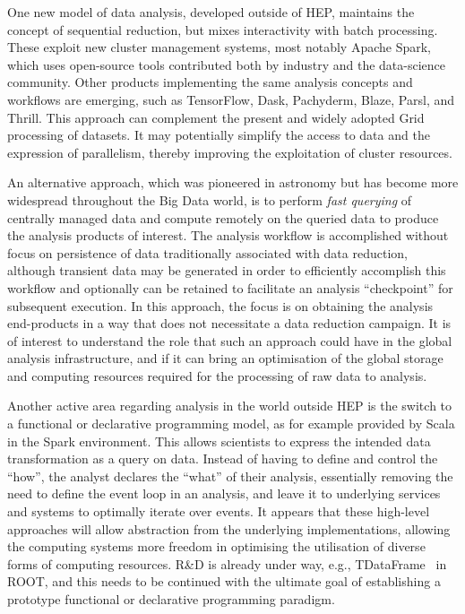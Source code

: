 \documentclass[twocolumn]{svjour3}          %
\begin{document}
One new model of data analysis, developed outside of HEP, maintains the
concept of sequential reduction, but mixes interactivity with
batch processing. These exploit new cluster management systems, most
notably Apache Spark, which uses open-source tools contributed both by
industry and the data-science community. Other products implementing the
same analysis concepts and workflows are emerging, such as TensorFlow,
Dask, Pachyderm, Blaze, Parsl, and Thrill. This approach can complement
the present and widely adopted Grid processing of datasets. It may
potentially simplify the access to data and the expression of
parallelism, thereby improving the exploitation of cluster resources.

An alternative approach, which was pioneered in astronomy but has become
more widespread throughout the Big Data world, is to perform \emph{fast
querying} of centrally managed data and compute remotely on the queried
data to produce the analysis products of interest. The analysis workflow
is accomplished without focus on persistence of data traditionally
associated with data reduction, although transient data may be generated
in order to efficiently accomplish this workflow and optionally can be
retained to facilitate an analysis ``checkpoint'' for subsequent
execution. In this approach, the focus is on obtaining the analysis
end-products in a way that does not necessitate a data reduction
campaign. It is of interest to understand the role
that such an approach could have in the global analysis infrastructure,
and if it can bring an optimisation of the global storage and computing
resources required for the processing of raw data to analysis.

Another active area regarding analysis in the world outside HEP is the
switch to a functional or declarative programming model, as for example
provided by Scala in the Spark environment. This allows scientists to
express the intended data transformation as a query on data. Instead of
having to define and control the ``how'', the analyst declares the
``what'' of their analysis, essentially removing the need to define the
event loop in an analysis, and leave it to underlying services and
systems to optimally iterate over events. It appears that these
high-level approaches will allow abstraction from the underlying
implementations, allowing the computing systems more freedom in
optimising the utilisation of diverse forms of computing resources. R\&D
is already under way, e.g., TDataFrame~\cite{TDataFrame} in ROOT, and
this needs to be continued with the ultimate goal of establishing a
prototype functional or declarative programming paradigm.
\end{document}
